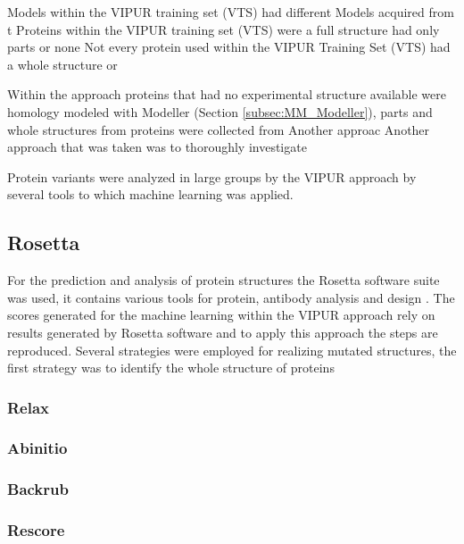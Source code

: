 Models within the VIPUR training set (VTS) had different
Models acquired from t
Proteins within the VIPUR training set (VTS) were a full structure had only parts or none
Not every protein used within the VIPUR Training Set (VTS) had a whole structure or 

Within the approach proteins that had no experimental structure available were homology modeled with Modeller (Section \ref{subsec:MM_Modeller}), parts and whole structures from proteins were collected from 
Another approac
Another approach that was taken was to thoroughly investigate 

Protein variants were analyzed in large groups by the VIPUR approach by several tools to which machine learning was applied. 

\subsection{Rosetta}
For the prediction and analysis of protein structures the Rosetta software suite was used, it contains various tools for protein, antibody analysis and design \cite{}.
The scores generated for the machine learning within the VIPUR approach rely on results generated by Rosetta software and to apply this approach the steps are reproduced.  
Several strategies were employed for realizing mutated structures, the first strategy was to identify the whole structure of proteins



\subsubsection{Relax}
\label{subsubsec:MM_Relax}

\subsubsection{Abinitio}
\label{subsubsec:MM_Abinitio}

\subsubsection{Backrub}
\label{subsubsec:MM_Backrub}

\subsubsection{Rescore}
\label{subsubsec:MM_Rescore}

\label{subsec:MM_Rosetta}

